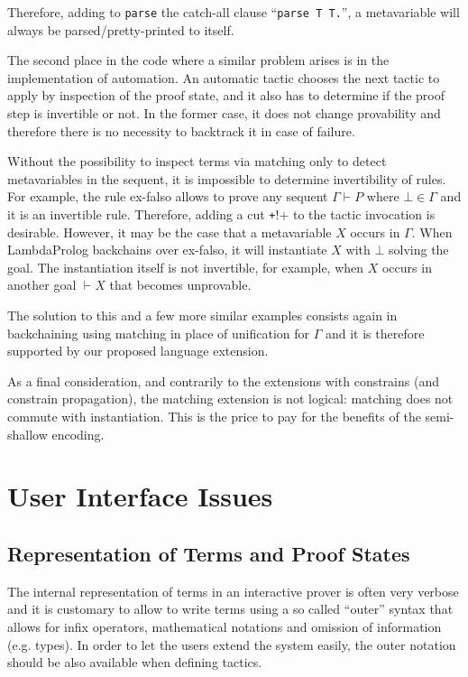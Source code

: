\documentclass[preprint]{sigplanconf}
\begin{document}
Therefore, adding to \verb+parse+ the catch-all clause ``\verb+parse T T.+'', a metavariable will always be parsed/pretty-printed to itself.

The second place in the code where a similar problem arises is in the implementation of automation. An automatic tactic chooses the next tactic to apply by inspection of the proof state, and it also has to determine if the proof step is invertible or not. In the former case, it does not change provability and therefore there is no necessity to backtrack it in case of failure.

Without the possibility to inspect terms via matching only to detect metavariables in the sequent, it is impossible to determine invertibility of rules. For example, the rule ex-falso allows to prove any sequent $\Gamma \vdash P$ where
$\bot \in \Gamma$ and it is an invertible rule. Therefore, adding a cut \texttt+!+ to the tactic invocation is desirable. However, it may be the case that
a metavariable $X$ occurs in $\Gamma$. When LambdaProlog backchains over ex-falso, it will instantiate $X$ with $\bot$ solving the goal. The instantiation itself is not invertible, for example, when $X$ occurs in another goal $\vdash X$ that becomes unprovable.

The solution to this and a few more similar examples consists again in backchaining using matching in place of unification for $\Gamma$ and it is therefore supported by our proposed language extension.

As a final consideration, and contrarily to the extensions with constrains (and constrain propagation), the matching extension is not logical: matching does not commute with instantiation. This is the price to pay for the benefits of the semi-shallow encoding.

\section{User Interface Issues}
\subsection{Representation of Terms and Proof States}
The internal representation of terms in an interactive prover is often very verbose and it is customary to allow to write terms using a so called ``outer'' syntax that allows for infix operators, mathematical notations and omission of information (e.g. types). In order to let the users extend the system easily, the outer notation should be also available when defining tactics.
\end{document}
